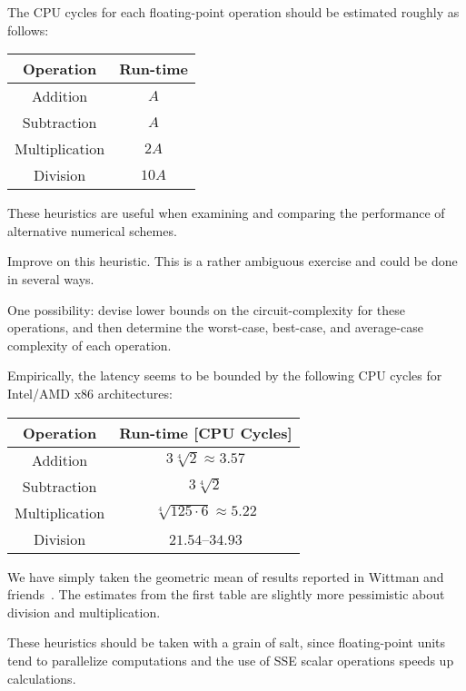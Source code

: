 \begin{heuristic}
  The CPU cycles for each floating-point operation should be estimated
  roughly as follows:
  \begin{center}
    \bgroup
    \def\arraystretch{1.125}
  \begin{tabular}{c|c}
    Operation & Run-time\\\hline
    Addition & $A$ \\
    Subtraction & $A$ \\
    Multiplication & $2A$ \\
    Division & $10A$
  \end{tabular}
  \egroup
  \end{center}
  These heuristics are useful when examining and comparing the
  performance of alternative numerical schemes.
\end{heuristic}
\begin{xca}
  Improve on this heuristic. This is a rather ambiguous exercise and
  could be done in several ways.

  One possibility: devise lower bounds on the circuit-complexity for
  these operations, and then determine the worst-case, best-case, and
  average-case complexity of each operation.
\end{xca}
\begin{ex}[x86-64 Estimates]
  Empirically, the latency seems to be bounded by the following CPU
  cycles for Intel/AMD x86 architectures:
  \begin{center}
  \bgroup
  \def\arraystretch{1.125}
  \begin{tabular}{c|c}
    Operation & Run-time [CPU Cycles]\\\hline
    Addition & $3 \sqrt[4]{2}\approx 3.57$ \\
    Subtraction &  $3\sqrt[4]{2}$ \\
    Multiplication & $\sqrt[4]{125\cdot 6}\approx5.22$ \\
    Division & $21.54$--$34.93$
  \end{tabular}
  \egroup
  \end{center}
  We have simply taken the geometric mean of results reported in Wittman
  and friends~\cite{DBLP:journals/corr/WittmannZHW15}. The estimates
  from the first table are slightly more pessimistic about division and
  multiplication.

  These heuristics should be taken with a grain of salt, since
  floating-point units tend to parallelize computations and the use of
  SSE scalar operations speeds up calculations.
\end{ex}
